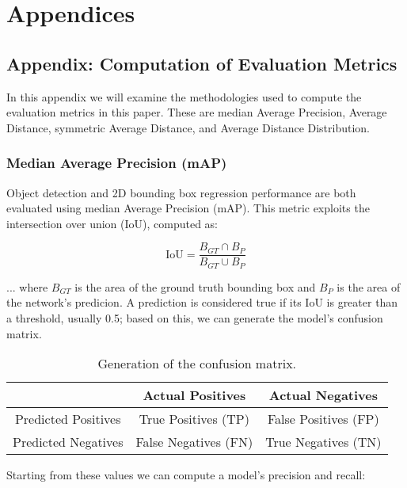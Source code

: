 \chapter{Appendices}

\section{Appendix: Computation of Evaluation Metrics}

In this appendix we will examine the methodologies used to compute the evaluation metrics in this paper. These are median Average Precision, Average Distance, symmetric Average Distance, and Average Distance Distribution.

\subsection{Median Average Precision (mAP)}

Object detection and 2D bounding box regression performance are both evaluated using median Average Precision (mAP). This metric exploits the intersection over union (IoU), computed as:

\begin{equation*}
    \text{IoU} = \frac{B_{GT} \cap B_{P}}{B_{GT} \cup B_{P}}
    \label{eq:IoU}
\end{equation*}

... where $B_{GT}$ is the area of the ground truth bounding box and $B_{P}$ is the area of the network's predicion. A prediction is considered true if its IoU is greater than a threshold, usually 0.5; based on this, we can generate the model's confusion matrix.

\begin{table}[ht]
    \begin{center}
        \begin{tabular}{c||c|c}
            \space & Actual Positives & Actual Negatives\\
            \hline\hline
            Predicted Positives & True Positives (TP)& False Positives (FP)\\
            \hline
            Predicted Negatives & False Negatives (FN)& True Negatives (TN)\\
        \end{tabular}
        \caption{Generation of the confusion matrix.}
    \end{center}
\end{table}

Starting from these values we can compute a model's precision and recall:

